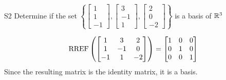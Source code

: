 \documentclass{sbgLAquiz}
\begin{document}
\begin{extract}\newpage\end{extract}
\begin{problem}{S2}
Determine if the set $\left\{\begin{bmatrix} 1 \\ 1 \\ -1 \end{bmatrix}, \begin{bmatrix} 3 \\ -1 \\ 1 \end{bmatrix},\begin{bmatrix} 2 \\ 0 \\ -2 \end{bmatrix}\right\}$ is a basis of $\mathbb{R}^3$
\end{problem}
\begin{solution}
$$\operatorname{RREF}\left(\begin{bmatrix} 1 & 3 & 2 \\ 1 & -1 & 0 \\ -1 & 1 & -2 \end{bmatrix} \right)= \begin{bmatrix} 1 & 0 &0 \\ 0 & 1 & 0 \\ 0 & 0 & 1\end{bmatrix}$$
Since the resulting matrix is the identity matrix, it is a basis.
\end{solution}
\end{document}
